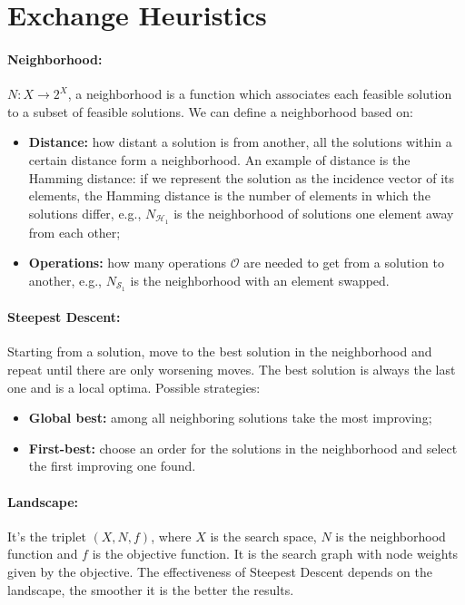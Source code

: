 \documentclass{article}
\begin{document}
	\section*{Exchange Heuristics}
	
	\paragraph{Neighborhood:} $N: X \rightarrow 2^X$, a neighborhood is a function which associates each feasible solution to a subset of feasible solutions. We can define a neighborhood based on: 
	\begin{itemize}
		\item \textbf{Distance:} how distant a solution is from another, all the solutions within a certain distance form a neighborhood. An example of distance is the Hamming distance: if we represent the solution as the incidence vector of its elements, the Hamming distance is the number of elements in which the solutions differ, e.g., $N_{\mathcal{H}_1}$ is the neighborhood of solutions one element away from each other; 
		\item \textbf{Operations:} how many operations $\mathcal{O}$ are needed to get from a solution to another, e.g., $N_{\mathcal{S}_1}$ is the neighborhood with an element swapped. \\
	\end{itemize}
	
	\paragraph{Steepest Descent:} Starting from a solution, move to the best solution in the neighborhood and repeat until there are only worsening moves. The best solution is always the last one and is a local optima. Possible strategies: 
	\begin{itemize}
		\item \textbf{Global best:} among all neighboring solutions take the most improving;
		\item \textbf{First-best:} choose an order for the solutions in the neighborhood and select the first improving one found.\\
	\end{itemize}
	
	\paragraph{Landscape:} It's the triplet $(X,N,f)$, where $X$ is the search space, $N$ is the neighborhood function and $f$ is the objective function. It is the search graph with node weights given by the objective. The effectiveness of Steepest Descent depends on the landscape, the smoother it is the better the results.\\
	
\end{document}
